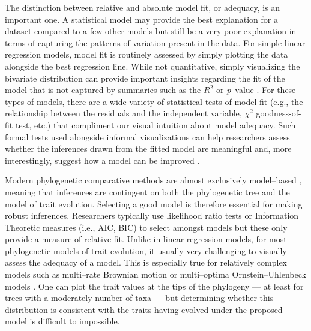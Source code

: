 \documentclass[a4paper,11pt]{article}
\begin{document}
The distinction between relative and absolute model fit, or adequacy, is an important one. A statistical model may provide the best explanation for a dataset compared to a few other models but still be a very poor explanation in terms of capturing the patterns of variation present in the data. For simple linear regression models, model fit is routinely assessed by simply plotting the data alongside the best regression line. While not quantitative, simply visualizing the bivariate distribution can provide important insights regarding the fit of the model that is not captured by summaries such as the $R^2$ or \emph{p}--value \citep[for a classic case study, see][]{anscombe1973}. For these types of models, there are a wide variety of statistical tests of model fit (e.g., the relationship between the residuals and the independent variable, $\chi^2$ goodness-of-fit test, etc.) that compliment our visual intuition about model adequacy. Such formal tests used alongside informal visualizations can help researchers assess whether the inferences drawn from the fitted model are meaningful and, more interestingly, suggest how a model can be improved \citep{Gelman2012}.

Modern phylogenetic comparative methods are almost exclusively model--based \citep[recently reviewed in][]{Omeara2012, PennellHarmon}, meaning that inferences are contingent on both the phylogenetic tree and the model of trait evolution. Selecting a good model is therefore essential for making robust inferences. Researchers typically use likelihood ratio tests or Information Theoretic measures (i.e., AIC, BIC) to select amongst models \citep{Mooers1999, Harmon2010, Hunt2012} but these only provide a measure of relative fit. Unlike in linear regression models, for most phylogenetic models of trait evolution, it usually very challenging to visually assess the adequacy of a model. This is especially true for relatively complex models such as multi--rate Brownian motion \citep{Omeara2006, Eastman2011} or multi--optima Ornstein--Uhlenbeck models \citep{ButlerKing2004, Beaulieu2012, UyedaBayou}. One can plot the trait values at the tips of the phylogeny --- at least for trees with a moderately number of taxa --- but determining whether this distribution is consistent with the traits having evolved under the proposed model is difficult to impossible. 
\end{document}
